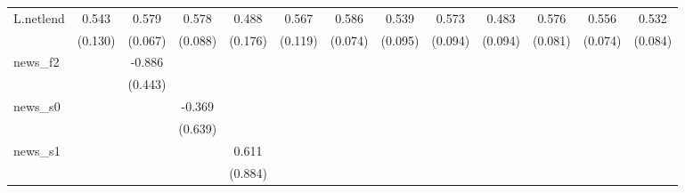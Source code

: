 {\begin{tabular}{l*{12}{c}}
\addlinespace
L.netlend   &       0.543\sym{***}&       0.579\sym{***}&       0.578\sym{***}&       0.488\sym{***}&       0.567\sym{***}&       0.586\sym{***}&       0.539\sym{***}&       0.573\sym{***}&       0.483\sym{***}&       0.576\sym{***}&       0.556\sym{***}&       0.532\sym{***}\\
            &     (0.130)         &     (0.067)         &     (0.088)         &     (0.176)         &     (0.119)         &     (0.074)         &     (0.095)         &     (0.094)         &     (0.094)         &     (0.081)         &     (0.074)         &     (0.084)         \\
\addlinespace
news\_f2     &                     &      -0.886\sym{**} &                     &                     &                     &                     &                     &                     &                     &                     &                     &                     \\
            &                     &     (0.443)         &                     &                     &                     &                     &                     &                     &                     &                     &                     &                     \\
\addlinespace
news\_s0     &                     &                     &      -0.369         &                     &                     &                     &                     &                     &                     &                     &                     &                     \\
            &                     &                     &     (0.639)         &                     &                     &                     &                     &                     &                     &                     &                     &                     \\
\addlinespace
news\_s1     &                     &                     &                     &       0.611         &                     &                     &                     &                     &                     &                     &                     &                     \\
            &                     &                     &                     &     (0.884)         &                     &                     &                     &                     &                     &                     &                     &                     \\

\end{tabular}}
